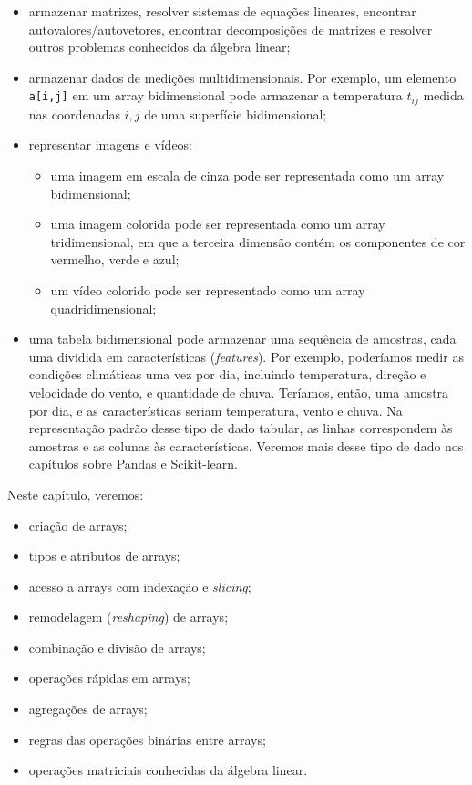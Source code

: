 \documentclass[11pt,a4paper]{article}
\begin{document}
\begin{itemize}
\item armazenar matrizes, resolver sistemas de equações lineares,
  encontrar autovalores/autovetores, encontrar decomposições de matrizes
  e resolver outros problemas conhecidos da álgebra linear;
\item armazenar dados de medições multidimensionais. Por exemplo, um
  elemento \texttt{a[i,j]} em um array bidimensional pode armazenar a
  temperatura $t_{ij}$ medida nas coordenadas $i, j$ de uma superfície
  bidimensional;
\item representar imagens e vídeos:
  \begin{itemize}
  \item uma imagem em escala de cinza pode ser representada como um
    array bidimensional;
  \item uma imagem colorida pode ser representada como um array
    tridimensional, em que a terceira dimensão contém os componentes de
    cor vermelho, verde e azul;
  \item um vídeo colorido pode ser representado como um array
    quadridimensional;
  \end{itemize}
\item uma tabela bidimensional pode armazenar uma sequência de amostras,
  cada uma dividida em características (\emph{features}). Por exemplo,
  poderíamos medir as condições climáticas uma vez por dia, incluindo
  temperatura, direção e velocidade do vento, e quantidade de chuva.
  Teríamos, então, uma amostra por dia, e as características seriam
  temperatura, vento e chuva. Na representação padrão desse tipo de
  dado tabular, as linhas correspondem às amostras e as colunas às
  características. Veremos mais desse tipo de dado nos capítulos sobre
  Pandas e Scikit-learn.
\end{itemize}

Neste capítulo, veremos:

\begin{itemize}
\item criação de arrays;
\item tipos e atributos de arrays;
\item acesso a arrays com indexação e \emph{slicing};
\item remodelagem (\emph{reshaping}) de arrays;
\item combinação e divisão de arrays;
\item operações rápidas em arrays;
\item agregações de arrays;
\item regras das operações binárias entre arrays;
\item operações matriciais conhecidas da álgebra linear.
\end{itemize}
\end{document}
